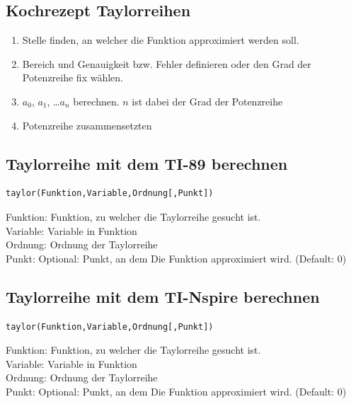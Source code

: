 \subsection{Kochrezept Taylorreihen}
\begin{enumerate}
  \item Stelle finden, an welcher die Funktion approximiert werden soll. 
  \item Bereich und Genauigkeit bzw. Fehler definieren oder den Grad der Potenzreihe fix wählen. 
  \item $a_0$, $a_1$, \dots $a_n$ berechnen. $n$ ist dabei der Grad der Potenzreihe
  \item Potenzreihe zusammensetzten
\end{enumerate}

\ifti
\subsection{Taylorreihe mit dem TI-89 berechnen}
\begin{verbatim}
taylor(Funktion,Variable,Ordnung[,Punkt])
\end{verbatim}
Funktion: Funktion, zu welcher die Taylorreihe gesucht ist. \\
Variable: Variable in Funktion\\
Ordnung: Ordnung der Taylorreihe\\
Punkt: Optional: Punkt, an dem Die Funktion approximiert wird. (Default: 0)
\fi
\ifnspire
\subsection{Taylorreihe mit dem TI-Nspire berechnen}
\begin{verbatim}
taylor(Funktion,Variable,Ordnung[,Punkt])
\end{verbatim}
Funktion: Funktion, zu welcher die Taylorreihe gesucht ist. \\
Variable: Variable in Funktion\\
Ordnung: Ordnung der Taylorreihe\\
Punkt: Optional: Punkt, an dem Die Funktion approximiert wird. (Default: 0)
\fi
